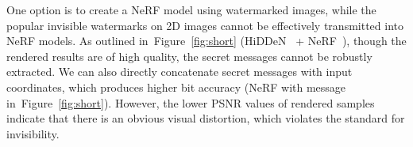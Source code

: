 \documentclass[10pt,twocolumn,letterpaper]{article}
\def\eg{{\emph{e.g.}}}
\newcommand{\Fref}[1]{Figure~\ref{#1}}
\def\eg{\emph{e.g.}}
\def\eg{{\emph{e.g.}}}
\begin{document}


One option is to create a NeRF model using watermarked images, while the popular invisible watermarks on 2D images cannot be effectively transmitted into NeRF models. As outlined in~\Fref{fig:short} (HiDDeN~\cite{zhu2018hidden} + NeRF~\cite{nerf2020}), though the rendered results are of high quality, the secret messages cannot be robustly extracted. We can also directly concatenate secret messages with input coordinates, which produces higher bit accuracy (NeRF with message in~\Fref{fig:short}). However, the lower PSNR values of rendered samples indicate that there is an obvious visual distortion, which violates the standard for invisibility. 



\end{document}
